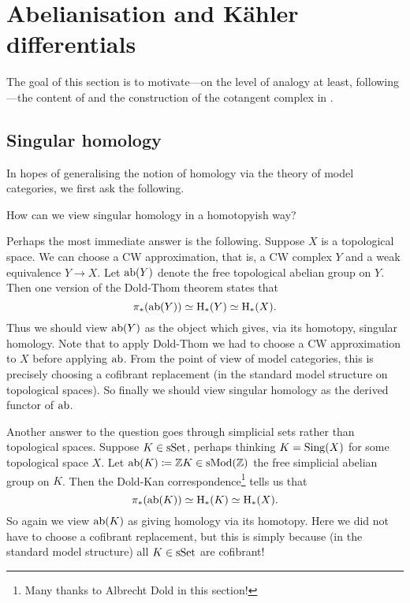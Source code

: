 
\section{Abelianisation and K\"ahler differentials}

The goal of this section is to motivate---on the level of analogy at
least, following \cite{goerss-modelsimplicial}---the content of
 and the construction of the cotangent complex in
.

\subsection{Singular homology}
\label{singhom}

In hopes of generalising the notion of homology via the theory of
model categories, we first ask the following.

\begin{question}
  How can we view singular homology in a homotopyish way?
\end{question}

\begin{nothing}
  \label{sing-doldthom}
  Perhaps the most immediate answer is the following. Suppose $X$ is a
  topological space. We can choose a CW approximation, that is, a CW
  complex $Y$ and a weak equivalence $Y \to X$. Let $\operatorname{ab}(Y)$ denote
  the free topological abelian group on $Y$. Then one version of the
  Dold-Thom theorem \cite{mccord-doldthom} states that
  \[
  \pi_*(\operatorname{ab}(Y)) \simeq \mathrm{H}_*(Y) \simeq \mathrm{H}_*(X).
  \]
  Thus we should view $\operatorname{ab}(Y)$ as the object which gives, via its
  homotopy, singular homology. Note that to apply Dold-Thom we had to
  choose a CW approximation to $X$ before applying $\operatorname{ab}$. From the
  point of view of model categories, this is precisely choosing a
  cofibrant replacement (in the standard model structure on
  topological spaces). So finally we should view singular homology as
  the derived functor of $\operatorname{ab}$.
\end{nothing}

\begin{nothing}
  \label{sing-doldkan}
  Another answer to the question goes through simplicial sets rather
  than topological spaces. Suppose $K \in \mathrm{s}\mathrm{Set}$, perhaps thinking $K =
  \operatorname{Sing}(X)$ for some topological space $X$. Let $\operatorname{ab}(K) \coloneqq \mathbb{Z}
  K\in \mathrm{s}\mathrm{Mod}(\mathbb{Z})$ the free simplicial abelian group on $K$.  Then the
  Dold-Kan correspondence\footnote{Many thanks to Albrecht Dold in this
    section!} tells us that
  \[
  \pi_*(\operatorname{ab}(K)) \simeq \mathrm{H}_*(K) \simeq \mathrm{H}_*(X).
  \]
  So again we view $\operatorname{ab}(K)$ as giving homology via its homotopy. Here
  we did not have to choose a cofibrant replacement, but this is
  simply because (in the standard model structure) all $K \in \mathrm{s}\mathrm{Set}$
  are cofibrant!
\end{nothing}

